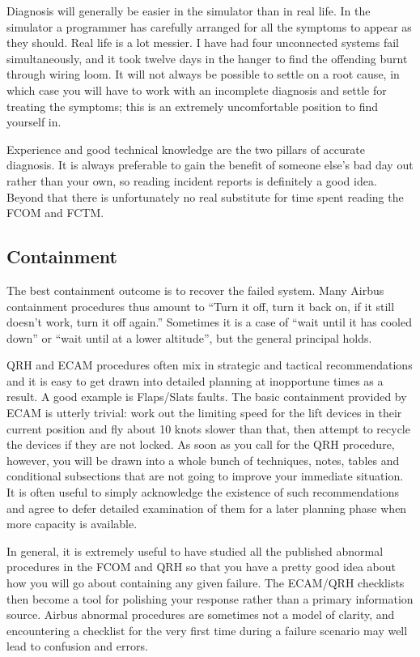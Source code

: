 \documentclass[a5paper,11pt,titlepage]{article}
\begin{document}
Diagnosis will generally be easier in the simulator than in real
life. In the simulator a programmer has carefully arranged for all the
symptoms to appear as they should. Real life is a lot messier. I have
had four unconnected systems fail simultaneously, and it took twelve
days in the hanger to find the offending burnt through wiring loom. It
will not always be possible to settle on a root cause, in which case you
will have to work with an incomplete diagnosis and settle for treating
the symptoms; this is an extremely uncomfortable position to find
yourself in.

Experience and good technical knowledge are the two pillars of accurate
diagnosis. It is always preferable to gain the benefit of someone else's
bad day out rather than your own, so reading incident reports is
definitely a good idea. Beyond that there is unfortunately no real
substitute for time spent reading the FCOM and FCTM.

\subsection{Containment}

The best containment outcome is to recover the failed system. Many
Airbus containment procedures thus amount to ``Turn it off, turn it back
on, if it still doesn't work, turn it off again.'' Sometimes it is a
case of ``wait until it has cooled down'' or ``wait until at a lower
altitude'', but the general principal holds.

QRH and ECAM procedures often mix in strategic and tactical
recommendations and it is easy to get drawn into detailed planning at
inopportune times as a result. A good example is Flaps/Slats faults. The
basic containment provided by ECAM is utterly trivial: work out the
limiting speed for the lift devices in their current position and fly
about 10 knots slower than that, then attempt to recycle the devices if
they are not locked. As soon as you call for the QRH procedure, however,
you will be drawn into a whole bunch of techniques, notes, tables and
conditional subsections that are not going to improve your immediate
situation. It is often useful to simply acknowledge the existence of
such recommendations and agree to defer detailed examination of them for
a later planning phase when more capacity is available.

In general, it is extremely useful to have studied all the published
abnormal procedures in the FCOM and QRH so that you have a pretty good
idea about how you will go about containing any given failure. The
ECAM/QRH checklists then become a tool for polishing your response
rather than a primary information source. Airbus abnormal procedures are
sometimes not a model of clarity, and encountering a checklist for the
very first time during a failure scenario may well lead to confusion and
errors.
\end{document}
